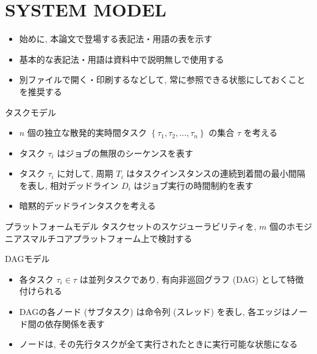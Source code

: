 
\section{SYSTEM MODEL}
\label{sec: system model}

\begin{frame}{}
    \begin{itemize}
        \item 始めに, 本論文で登場する表記法・用語の表を示す
        \item 基本的な表記法・用語は資料中で説明無しで使用する
        \item 別ファイルで開く・印刷するなどして, 常に参照できる状態にしておくことを推奨する
    \end{itemize}
\end{frame}



\begin{frame}{タスクモデル}
    \begin{itemize}
        \item $n$ 個の独立な散発的実時間タスク $\left\{\tau_{1}, \tau_{2}, \ldots, \tau_{n}\right\}$ の集合 $\tau$ を考える
        \item タスク $\tau_{i}$ はジョブの無限のシーケンスを表す
        \item タスク $\tau_{i}$ に対して, 周期 $T_{i}$ はタスクインスタンスの連続到着間の最小間隔を表し, 相対デッドライン $D_{i}$ はジョブ実行の時間制約を表す
        \item 暗黙的デッドラインタスクを考える
    \end{itemize}
\end{frame}

\begin{frame}{プラットフォームモデル}
    タスクセットのスケジューラビリティを, $m$ 個のホモジニアスマルチコアプラットフォーム上で検討する
\end{frame}

\begin{frame}{DAGモデル}
    \begin{itemize}
        \item 各タスク $\tau_{i} \in \tau$ は並列タスクであり, 有向非巡回グラフ (DAG) として特徴付けられる
        \item DAGの各ノード (サブタスク) は命令列 (スレッド) を表し, 各エッジはノード間の依存関係を表す
        \item ノードは, その先行タスクが全て実行されたときに実行可能な状態になる
    \end{itemize}
\end{frame}

